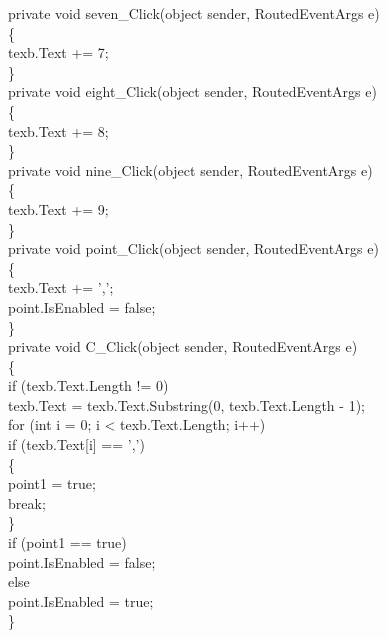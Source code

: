         private void seven\_Click(object sender, RoutedEventArgs e)\\
        \{\\
            texb.Text += 7;\\
        \}\\

        private void eight\_Click(object sender, RoutedEventArgs e)\\
        \{\\
            texb.Text += 8;\\
        \}\\

        private void nine\_Click(object sender, RoutedEventArgs e)\\
        \{\\
            texb.Text += 9;\\
        \}\\

        private void point\_Click(object sender, RoutedEventArgs e)\\
        \{\\
            texb.Text += ',';\\
            point.IsEnabled = false;\\
        \}\\

        private void C\_Click(object sender, RoutedEventArgs e)\\
        \{\\
            if (texb.Text.Length != 0) \\
            texb.Text = texb.Text.Substring(0, texb.Text.Length - 1);\\
            for (int i = 0; i < texb.Text.Length; i++)\\
                if (texb.Text[i] == ',')\\
                \{\\
                    point1 = true;\\
                    break;\\
                \}\\
            if (point1 == true)\\
                point.IsEnabled = false;\\

            else\\
                point.IsEnabled = true;\\


        \}\\

